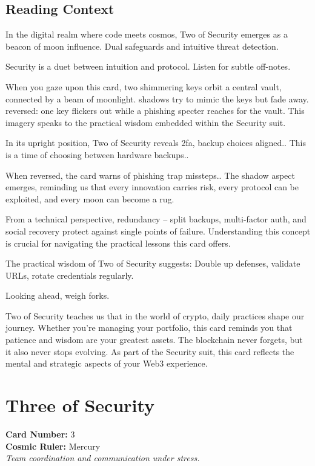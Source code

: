 \documentclass[11pt,oneside]{book}
\begin{document}
\begin{minipage}[t]{0.55\textwidth}
  \subsection*{Reading Context}
  In the digital realm where code meets cosmos, Two of Security emerges as a beacon of moon influence. Dual safeguards and intuitive threat detection.

  Security is a duet between intuition and protocol. Listen for subtle off-notes.

  When you gaze upon this card, two shimmering keys orbit a central vault, connected by a beam of moonlight. shadows try to mimic the keys but fade away. reversed: one key flickers out while a phishing specter reaches for the vault. This imagery speaks to the practical wisdom embedded within the Security suit.

  In its upright position, Two of Security reveals 2fa, backup choices aligned.. This is a time of choosing between hardware backups..

  When reversed, the card warns of phishing trap missteps.. The shadow aspect emerges, reminding us that every innovation carries risk, every protocol can be exploited, and every moon can become a rug.

  From a technical perspective, redundancy – split backups, multi-factor auth, and social recovery protect against single points of failure. Understanding this concept is crucial for navigating the practical lessons this card offers.

  The practical wisdom of Two of Security suggests: Double up defenses, validate URLs, rotate credentials regularly.

  Looking ahead, weigh forks.

  Two of Security teaches us that in the world of crypto, daily practices shape our journey. Whether you're managing your portfolio, this card reminds you that patience and wisdom are your greatest assets. The blockchain never forgets, but it also never stops evolving. As part of the Security suit, this card reflects the mental and strategic aspects of your Web3 experience.

\end{minipage}

\newpage
\section*{Three of Security}

\begin{minipage}[t]{0.55\textwidth}
  \vspace{0pt}
  \textbf{Card Number:} 3\\  \textbf{Cosmic Ruler:} Mercury\\  \textit{Team coordination and communication under stress.}
\end{minipage}
\end{document}
